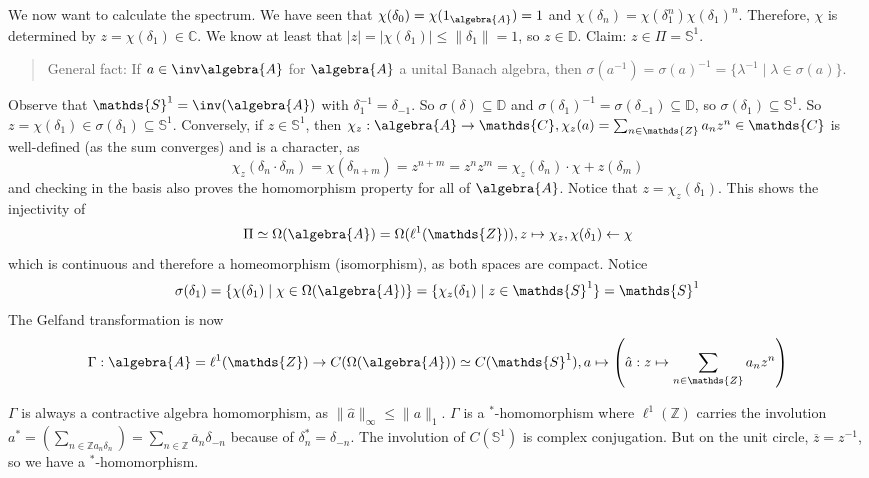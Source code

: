 \documentclass[a4paper]{article}
\newcommand{\unitcircle}{\mathds{S}^1}
\begin{document}
\begin{example}
\begin{enumerate}
		We now want to calculate the spectrum.
		We have seen that $\chi(\delta_0) = \chi(1_\algebra{A}) = 1$ and $\chi(\delta_n) = \chi(\delta_1^n)  \chi(\delta_1)^n$.
		Therefore, $\chi$ is determined by $z = \chi(\delta_1) \in \mathds{C}$.
		We know at least that $|z| = |\chi(\delta_1)| \leq \|\delta_1\| = 1$, so $z \in \mathds{D}$.
		Claim: $z \in \Pi = \mathds{S}^1$.
		\begin{quote}
			General fact: If $a \in \inv \algebra{A}$ for $\algebra{A}$ a unital Banach algebra, then $\sigma(a^{-1}) = \sigma(a)^{-1} = \{ \lambda^{-1} \mid \lambda \in \sigma(a) \}$.
		\end{quote}
		Observe that $\mathds{S}^1 = \inv(\algebra{A})$ with $\delta_1^{-1} = \delta_{-1}$.
		So $\sigma(\delta) \subseteq \mathds{D}$ and $\sigma(\delta_1)^{-1} = \sigma(\delta_{-1}) \subseteq \mathds{D}$, so $\sigma(\delta_1) \subseteq \mathds{S}^1$. 
		So $z = \chi(\delta_1) \in \sigma(\delta_1) \subseteq \mathds{S}^1$.
		Conversely, if $z \in \mathds{S}^1$, then $\chi_z: \algebra{A} \to \mathds{C}, \chi_z(a) = \sum_{n \in \mathds{Z}} a_n z^n \in \mathds{C}$ is well-defined (as the sum converges) and is a character, as 
		\begin{equation*}
			\chi_z(\delta_n \cdot \delta_m) = \chi(\delta_{n + m}) = z^{n+m} = z^n z^m = \chi_z(\delta_n) \cdot \chi+z(\delta_m)
		\end{equation*}
		and checking in the basis also proves the homomorphism property for all of $\algebra{A}$. Notice that $z = \chi_z(\delta_1)$. This shows the injectivity of 
		\begin{equation*}
			\Pi \simeq \Omega(\algebra{A}) = \Omega(\ell^1(\mathds{Z})), z \mapsto \chi_z, \chi(\delta_1) \leftarrow \chi
		\end{equation*}
		which is continuous and therefore a homeomorphism (isomorphism), as both spaces are compact.
		Notice 
		\begin{equation*}
			\sigma(\delta_1) = \{\chi(\delta_1) \mid \chi \in \Omega(\algebra{A}) \}  = \{\chi_z(\delta_1) \mid z \in \mathds{S}^1 \} = \mathds{S}^1
		\end{equation*}
		The Gelfand transformation is now
		\begin{equation*}
			\Gamma: \algebra{A} = \ell^1(\mathds{Z}) \to C(\Omega(\algebra{A})) \simeq C(\mathds{S}^1), a \mapsto  \left( \hat a: z \mapsto \sum_{n \in \mathds{Z}} a_n z^n \right)
		\end{equation*}

		$\Gamma$ is always a contractive algebra homomorphism, as $\|\hat{a}\|_\infty \leq \|a\|_1$.
		$\Gamma$ is a $^*$-homomorphism where $\ell^1(\mathds{Z})$ carries the involution $a^* = \left(\sum_{n \in \mathds{Z} a_n \delta_n}\right) = \sum_{n \in \mathds{Z}} \overline{a}_n \delta_{-n}$ because of $\delta_n^* = \delta_{-n}$.
		The involution of $C(\unitcircle)$ is complex conjugation. But on the unit circle, $\overline{z} = z^{-1}$, so we have a $^*$-homomorphism.


\end{enumerate}
\end{example}
\end{document}
